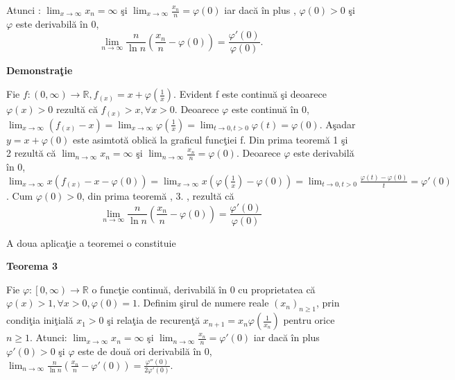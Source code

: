 \documentclass[a4paper,12pt,oneside]{report}
\begin{document}
Atunci :
\(\lim_{x \to \infty } x_{n} = \infty\) \c si \(\lim_{x \to \infty }\frac{x_{n}}{n} = \varphi\left ( 0 \right )\) iar dac\u a \^ in plus , \(\varphi\left ( 0 \right )> 0\) \c si  \(\varphi\) este derivabil\u a \^ in 0, 
\begin{displaymath}
  \lim_{n \to \infty }\frac{n}{\ln n }\left ( \frac{x_{n}}{n} -\varphi \left ( 0 \right )\right ) = \frac{{\varphi }'\left ( 0 \right )}{\varphi \left ( 0 \right )}.
\end{displaymath}
 

\textbf{Demonstra\c tie}

Fie \(f : \left ( 0,\infty  \right ) \to \mathbb{R}, f_{\left ( x \right )} = x+ \varphi \left ( \frac{1}{x} \right )\). Evident f este continu\u a \c si deoarece \(\varphi \left ( x \right )> 0\) rezult\u a c\u a \(f_{\left ( x \right )}> x, \forall x> 0 \). 
Deoarece \(\varphi\) este continu\u a \^ in 0, \(\lim_{x \to \infty }\left ( f_{\left ( x \right ) }-x\right ) = \lim_{x \to \infty }\varphi \left ( \frac{1}{x} \right )  = \lim_{t \to 0, t> 0 }\varphi \left ( t \right ) = \varphi \left ( 0 \right )\). 
A\c sadar \(y= x+\varphi \left ( 0 \right )\) este asimtot\u a oblic\u a la graficul func\c tiei f. Din prima teorem\u a 1 \c si 2 rezult\u a c\u a \(\lim_{n \to \infty }x_{n} = \infty\) \c si \(\lim_{n \to \infty }\frac{x_{n}}{n} = \varphi \left ( 0 \right )\). Deoarece \(\varphi\) este derivabil\u a \^ in 0, \(\lim_{x \to \infty } x\left ( f_{\left ( x \right )}-x- \varphi \left ( 0 \right ) \right ) = \lim_{x \to \infty } x\left ( \varphi \left ( \frac{1}{x} \right ) -\varphi \left ( 0 \right )\right ) = \lim_{t \to 0, t> 0 } \frac{\varphi \left ( t \right )-\varphi \left ( 0 \right )}{t} = {\varphi }'\left ( 0 \right )\). Cum \(\varphi \left ( 0 \right )> 0\), din prima teorem\u a , 3. , rezult\u a c\u a 
\begin{displaymath}
  \lim_{n \to \infty }\frac{n}{\ln n } \left ( \frac{x_{n}}{n }- \varphi \left ( 0 \right ) \right )= \frac{{\varphi}'\left ( 0 \right )}{\varphi \left ( 0 \right )}
\end{displaymath}


A doua aplica\c tie a teoremei o constituie 

\textbf{Teorema 3} 

Fie \(\varphi : \left [ 0,\infty  \right ) \to \mathbb{R}\) o func\c tie continu\u a, derivabil\u a \^ in 0 cu proprietatea c\u a \(\varphi \left ( x \right )> 1, \forall x> 0, \varphi \left ( 0 \right ) = 1\). Definim \c sirul de numere reale \(\left ( x_{n} \right )_{n\geq 1}\), prin condi\c tia ini\c tial\u a \(x_{1}> 0\) \c si rela\c tia de recuren\c t\u a \(x_{n+1}= x_{n }\varphi\left ( \frac{1}{x_{n}} \right )\) pentru orice \(n\geq 1\). 
Atunci:
\(\lim_{x \to \infty }x_{n} = \infty\) \c si \(\lim_{n \to \infty }\frac{x_{n}}{n} = {\varphi }'\left ( 0 \right )\) iar dac\u a \^ in plus  \({\varphi }'\left ( 0 \right )> 0\) \c si \(\varphi\) este de dou\u a ori derivabil\u a \^ in 0, \(\lim_{n \to \infty }\frac{n}{\ln n}\left ( \frac{x_{n}}{n}-{\varphi }' \left ( 0 \right )\right )= \frac{{\varphi }''\left ( 0 \right )}{2{\varphi }'\left ( 0 \right )}\). 
\end{document}

